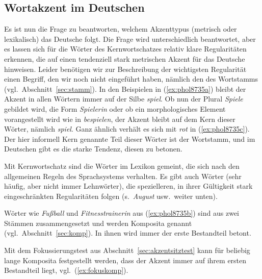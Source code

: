 \subsection{Wortakzent im Deutschen}

\label{sec:deutscherwortakzent}

Es ist nun die Frage zu beantworten, welchem Akzenttypus (metrisch oder lexikalisch) das Deutsche folgt.
Die Frage wird unterschiedlich beantwortet, aber es lassen sich für die Wörter des Kernwortschatzes relativ klare Regularitäten erkennen, die auf einen tendenziell stark metrischen Akzent für das Deutsche hinweisen.
Leider benötigen wir zur Beschreibung der wichtigsten Regularität einen Begriff, den wir noch nicht eingeführt haben, nämlich den des \label{abs:3453457}Wortstamms (vgl.\ Abschnitt~\ref{sec:stamm}).
In den Beispielen in (\ref{ex:phol8735a}) bleibt der Akzent in allen Wörtern immer auf der Silbe \textit{spiel}.
Ob nun der Plural \textit{Spiele} gebildet wird, die Form \textit{Spielerin} oder ob ein morphologisches Element vorangestellt wird wie in \textit{bespielen}, der Akzent bleibt auf dem Kern dieser Wörter, nämlich \textit{spiel}.
Ganz ähnlich verhält es sich mit \textit{rot} in (\ref{ex:phol8735c}).
Der hier informell Kern genannte Teil dieser Wörter ist der Wortstamm, und im Deutschen gibt es die starke Tendenz, diesen zu betonen.


Mit Kernwortschatz sind die Wörter im Lexikon gemeint, die sich nach den allgemeinen Regeln des Sprachsystems verhalten.
Es gibt auch Wörter (sehr häufig, aber nicht immer Lehnwörter), die spezielleren, in ihrer Gültigkeit stark eingeschränkten Regularitäten folgen (s.\ \textit{August} usw.\ weiter unten).

Wörter wie \textit{Fußball} und \textit{Fitnesstrainerin} aus (\ref{ex:phol8735b}) sind aus zwei Stämmen zusammengesetzt und werden Komposita genannt (vgl.\ Abschnitt~\ref{sec:komp}).
In ihnen wird immer der erste Bestandteil betont.


Mit dem Fokussierungstest aus Abschnitt~\ref{sec:akzentsitztest} kann für beliebig lange Komposita festgestellt werden, dass der Akzent immer auf ihrem ersten Bestandteil liegt, vgl.\ (\ref{ex:fokuskomp}).

\begin{exe}
  \ex\label{ex:fokuskomp}
  \begin{xlist}
  \end{xlist}
\end{exe}

